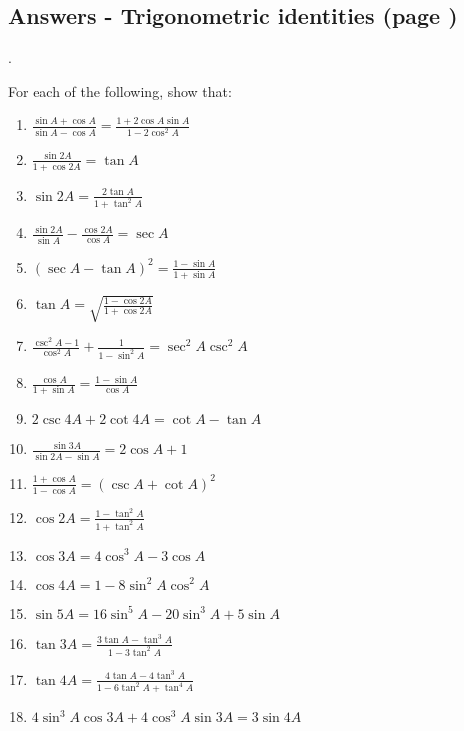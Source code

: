 \documentclass[../main.tex]{subfiles}
\begin{document}
\subsection*{Answers - Trigonometric identities (page \pageref{Trig identities})}
\label{Trig identities answers}.

For each of the following, show that:
\begin{enumerate}
    \item $\frac{\sin{A}+\cos{A}}{\sin{A}-\cos{A}}=\frac{1+2\cos{A}\sin{A}}{1-2\cos^2{A}}$
    
    \item $\frac{\sin{2A}}{1+\cos{2A}}=\tan{A}$
    
    \item $\sin{2A}=\frac{2\tan{A}}{1+\tan^2{A}}$
    
    \item $\frac{\sin{2A}}{\sin{A}}-\frac{\cos{2A}}{\cos{A}}=\sec{A}$
    
    \item $(\sec{A}-\tan{A})^2=\frac{1-\sin{A}}{1+\sin{A}}$
    
    \item $\tan{A}=\sqrt{\frac{1-\cos{2A}}{1+\cos{2A}}}$

    \item $\frac{\csc^2{A}-1}{\cos^2{A}}+\frac{1}{1-\sin^2{A}}=\sec^2{A}\csc^2{A}$
    
    \item $\frac{\cos{A}}{1+\sin{A}}=\frac{1-\sin{A}}{\cos{A}}$
    
    \item $2\csc{4A}+2\cot{4A}=\cot{A}-\tan{A}$
    
    \item $\frac{\sin{3A}}{\sin{2A}-\sin{A}}=2\cos{A}+1$
    
    \item $\frac{1+\cos{A}}{1-\cos{A}}=(\csc{A}+\cot{A})^2$
    
    \item $\cos{2A}=\frac{1-\tan^2{A}}{1+\tan^2{A}}$
    
    \item $\cos{3A}=4\cos^3{A}-3\cos{A}$
    
    \item $\cos{4A}=1-8\sin^2{A}\cos^2{A}$
    
    \item $\sin{5A}=16\sin^5{A}-20\sin^3{A}+5\sin{A}$
    
    \item $\tan{3A}=\frac{3\tan{A}-\tan^3{A}}{1-3\tan^2{A}}$
    
    \item $\tan{4A}=\frac{4\tan{A}-4\tan^3{A}}{1-6\tan^2{A}+\tan^4{A}}$
    
    \item $4\sin^3{A}\cos{3A}+4\cos^3{A}\sin{3A}=3\sin{4A}$


\end{enumerate}
\end{document}
